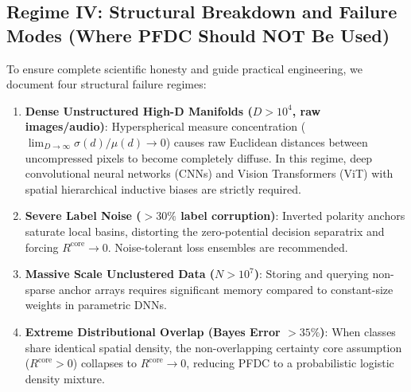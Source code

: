 \documentclass[preprint,review,12pt]{elsarticle}
\begin{document}
\subsection{Regime IV: Structural Breakdown and Failure Modes (Where PFDC Should NOT Be Used)}
To ensure complete scientific honesty and guide practical engineering, we document four structural failure regimes:
\begin{enumerate}
    \item \textbf{Dense Unstructured High-D Manifolds ($D > 10^4$, raw images/audio)}: Hyperspherical measure concentration ($\lim_{D \to \infty} \sigma(d)/\mu(d) \to 0$) causes raw Euclidean distances between uncompressed pixels to become completely diffuse. In this regime, deep convolutional neural networks (CNNs) and Vision Transformers (ViT) with spatial hierarchical inductive biases are strictly required.
    \item \textbf{Severe Label Noise ($> 30\%$ label corruption)}: Inverted polarity anchors saturate local basins, distorting the zero-potential decision separatrix and forcing $R^{\mathrm{core}} \to 0$. Noise-tolerant loss ensembles are recommended.
    \item \textbf{Massive Scale Unclustered Data ($N > 10^7$)}: Storing and querying non-sparse anchor arrays requires significant memory compared to constant-size weights in parametric DNNs.
    \item \textbf{Extreme Distributional Overlap (Bayes Error $> 35\%$)}: When classes share identical spatial density, the non-overlapping certainty core assumption ($R^{\mathrm{core}} > 0$) collapses to $R^{\mathrm{core}} \to 0$, reducing PFDC to a probabilistic logistic density mixture.
\end{enumerate}
\end{document}
